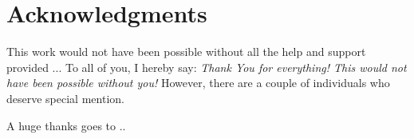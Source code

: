 \chapter*{Acknowledgments}

\hinttext{}

This work would not have been possible without all the help and support provided ... To all of you, I hereby say: \emph{Thank You for everything! This would not have been possible without you!} However, there are a couple of individuals who deserve special mention.
\newline

A huge thanks goes to ..

\hinttext{}
